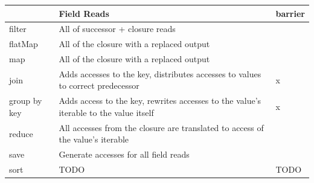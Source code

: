     \begin{tabularx}{0.5\textwidth}{l|X|l}
    
        ~            & Field Reads                                                                           & barrier \\ \hline
        filter       & All of successor + closure reads                                                      & ~       \\ 
        flatMap  & All of the closure with a replaced output                                             & ~       \\ 
        map        & All of the closure with a replaced output                                             & ~       \\ 
        join         & Adds accesses to the key, distributes accesses to values to correct predecessor       & x       \\ 
        group by key & Adds access to the key, rewrites accesses to the value's iterable to the value itself & x       \\ 
        reduce       & All accesses from the closure are translated to access of the value's iterable        & ~       \\ 
        save         & Generate accesses for all field reads                                                 & ~       \\ 
        sort         & TODO                                                                                  & TODO    \\ 


    \end{tabularx}
    \label{table:field_reduction}

